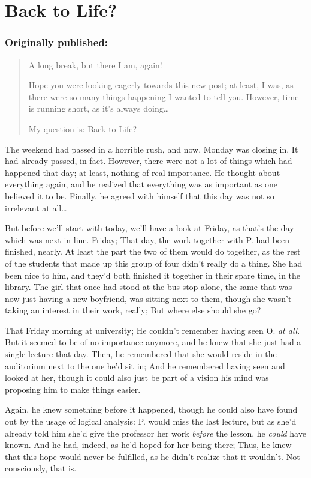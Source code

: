 \chapter{Back to Life?}
\label{cha:back-life}
\subsection*{Originally published: }
\begin{quote}
A long break, but there I am, again!

Hope you were looking eagerly towards this new post; at least, I was, as there were so many things happening I wanted to tell you. However, time is running short, as it's always doing\dots{}

My question is: Back to Life?
\end{quote}

The weekend had passed in a horrible rush, and now, Monday was closing in. 
It had already passed, in fact. 
However, there were not a lot of things which had happened that day; at least, nothing of real importance. He thought about everything again, and he realized that everything was as important as one believed it to be. Finally, he agreed with himself that this day was not so irrelevant at all\dots{}

But before we'll start with today, we'll have a look at Friday, as that's the day which was next in line. 
Friday; That day, the work together with P. had been finished, nearly. At least the part the two of them would do together, as the rest of the students that made up this group of four didn't really do a thing. She had been nice to him, and they'd both finished it together in their spare time, in the library. The girl that once had stood at the bus stop alone, the same that was now just having a new boyfriend, was sitting next to them, though she wasn't taking an interest in their work, really; But where else should she go?

That Friday morning at university; He couldn't remember having seen O. \emph{at all}. But it seemed to be of no importance anymore, and he knew that she just had a single lecture that day. Then, he remembered that she would reside in the auditorium next to the one he'd sit in; And he remembered having seen and looked at her, though it could also just be part of a vision his mind was proposing him to make things easier.

Again, he knew something before it happened, though he could also have found out by the usage of logical analysis: P. would miss the last lecture, but as she'd already told him she'd give the professor her work \emph{before} the lesson, he \emph{could} have known. And he had, indeed, as he'd hoped for her being there; Thus, he knew that this hope would never be fulfilled, as he didn't realize that it wouldn't. Not consciously, that is.

